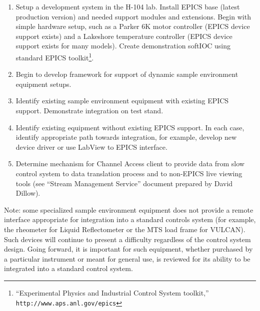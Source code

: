 \begin{enumerate}
\item Setup a development system in the H-104 lab. Install EPICS
base (latest production version) and needed support modules
and extensions. Begin with simple hardware setup, such as a
Parker 6K motor controller (EPICS device support exists) and a
Lakeshore temperature controller (EPICS device support exists for
many models).  Create demonstration softIOC using standard EPICS
toolkit\footnote{``Experimental Physics and Industrial Control System
toolkit,'' \texttt{http://www.aps.anl.gov/epics} }.

\item Begin to develop framework for support of dynamic sample environment
equipment setups.

\item Identify existing sample environment equipment with existing EPICS
support. Demonstrate integration on test stand.

\item Identify existing equipment without existing EPICS support.
In each case, identify appropriate path towards integration, for example,
develop new device driver or use LabView to EPICS interface.

\item Determine mechanism for Channel Access client to provide data from
slow control system to data translation process and to non-EPICS live
viewing tools (see ``Stream Management Service'' document prepared by
David Dillow).

\end{enumerate}



Note: some specialized sample environment equipment does not provide a
remote interface appropriate for integration into a standard controls
system (for example, the rheometer for Liquid Reflectometer or the
MTS load frame for VULCAN). Such devices will continue to present a
difficulty regardless of the control system design. Going forward,
it is important for such equipment, whether purchased by a particular
instrument or meant for general use, is reviewed for its ability to be
integrated into a standard control system.


